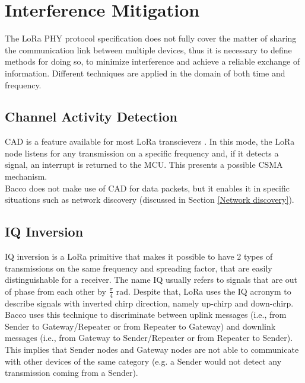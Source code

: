 \section{Interference Mitigation}
The LoRa PHY protocol specification does not fully cover the matter of sharing the communication link between multiple
devices, thus it is necessary to define methods for doing so, to minimize interference and achieve
a reliable exchange of information. Different techniques are applied in the domain of both time and frequency.

\subsection{Channel Activity Detection}
\Gls{CAD} is a feature available for most LoRa transcievers \cite{cad}. In this mode, the LoRa node
listens for any transmission on a specific frequency and, if it detects a signal, an interrupt is returned to the
\gls{MCU}. This
presents a possible \gls{CSMA} mechanism.\\
Bacco does not make use of \gls{CAD} for data packets, but it enables it in specific situations such as network discovery (discussed
in Section \ref{Network discovery}).

\subsection{IQ Inversion}
\Gls{IQ} inversion is a LoRa primitive that makes it possible to have 2 types of transmissions on the same frequency and
spreading factor, that are easily distinguishable for a receiver. The name \gls{IQ} usually refers to
signals that are out of phase from each other by $\frac{\pi}{4}$ rad. Despite that, LoRa uses the \gls{IQ} acronym to describe
signals with inverted chirp direction, namely up-chirp and down-chirp.\\
Bacco uses this technique to discriminate between uplink messages (i.e., from Sender to
Gateway/Repeater or from Repeater to Gateway) and downlink messages (i.e., from Gateway to Sender/Repeater or from
Repeater to Sender). This implies that Sender nodes and Gateway nodes are not able to communicate with other devices of
the same category (e.g. a Sender would not detect any transmission coming from a Sender).

